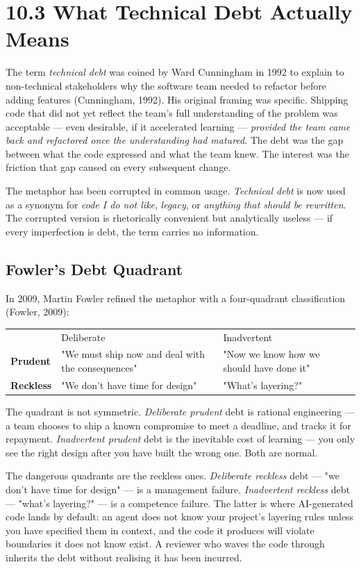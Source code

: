 \documentclass[11pt,a4paper]{book}
\begin{document}
\section{10.3 What Technical Debt Actually Means}

The term \textit{technical debt} was coined by Ward Cunningham in 1992 to explain to non-technical stakeholders why the software team needed to refactor before adding features (Cunningham, 1992). His original framing was specific. Shipping code that did not yet reflect the team's full understanding of the problem was acceptable --- even desirable, if it accelerated learning --- \textit{provided the team came back and refactored once the understanding had matured}. The debt was the gap between what the code expressed and what the team knew. The interest was the friction that gap caused on every subsequent change.

The metaphor has been corrupted in common usage. \textit{Technical debt} is now used as a synonym for \textit{code I do not like}, \textit{legacy}, or \textit{anything that should be rewritten}. The corrupted version is rhetorically convenient but analytically useless --- if every imperfection is debt, the term carries no information.

\subsection{Fowler's Debt Quadrant}

In 2009, Martin Fowler refined the metaphor with a four-quadrant classification (Fowler, 2009):

\begin{tabular}{lll}
\hline
 & Deliberate & Inadvertent \\
\textbf{Prudent} & "We must ship now and deal with the consequences" & "Now we know how we should have done it" \\
\textbf{Reckless} & "We don't have time for design" & "What's layering?" \\
\hline
\end{tabular}

The quadrant is not symmetric. \textit{Deliberate prudent} debt is rational engineering --- a team chooses to ship a known compromise to meet a deadline, and tracks it for repayment. \textit{Inadvertent prudent} debt is the inevitable cost of learning --- you only see the right design after you have built the wrong one. Both are normal.

The dangerous quadrants are the reckless ones. \textit{Deliberate reckless} debt --- "we don't have time for design" --- is a management failure. \textit{Inadvertent reckless} debt --- "what's layering?" --- is a competence failure. The latter is where AI-generated code lands by default: an agent does not know your project's layering rules unless you have specified them in context, and the code it produces will violate boundaries it does not know exist. A reviewer who waves the code through inherits the debt without realising it has been incurred.
\end{document}
